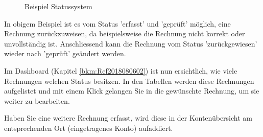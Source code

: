 \begin{figure}[H]
\caption{Beispiel Statussystem}
\end{figure}
In obigem Beispiel ist es vom Status 'erfasst' und 'geprüft' möglich, eine Rechnung zurückzuweisen, da beispielsweise die Rechnung nicht korrekt oder unvollständig ist. Anschliessend kann die Rechnung vom Status 'zurückgewiesen' wieder nach 'geprüft' geändert werden.

\vspace{\baselineskip}

Im Dashboard (Kapitel \ref{bkm:Ref2018080602}) ist nun ersichtlich, wie viele Rechnungen welchen Status besitzen. In den Tabellen werden diese Rechnungen aufgelistet und mit einem Klick gelangen Sie in die gewünschte Rechnung, um sie weiter zu bearbeiten.

\vspace{\baselineskip}

Haben Sie eine weitere Rechnung erfasst, wird diese in der Kontenübersicht am entsprechenden Ort (eingetragenes Konto) aufaddiert.

